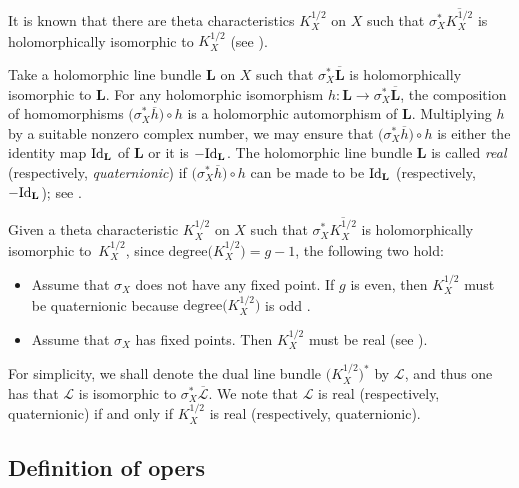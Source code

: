 \documentclass[pdftex]{sigma}
\numberwithin{equation}{section}
\begin{document}
It is known that there are theta characteristics $K^{1/2}_X$ on $X$ such that $\sigma^*_X
\overline{K^{1/2}_X}$ is holomorphically isomorphic to $K^{1/2}_X$ (see \cite[p.~61, Remark
2]{At2}).

Take a holomorphic line bundle $\mathbf L$ on $X$ such that $\sigma^*_X \overline{\mathbf
L}$ is holomorphically isomorphic to $\mathbf L$. For any holomorphic isomorphism $h\colon
{\mathbf L} \longrightarrow \sigma^*_X \overline{\mathbf L}$, the composition of
homomorphisms $\bigl(\sigma^*_X \overline{h}\bigr)\circ h$ is a holomorphic automorphism of ${\mathbf
L}$. Multiplying $h$ by a suitable nonzero complex number, we may ensure that $\bigl(\sigma^*_X
\overline{h}\bigr)\circ h$ is either the identity map ${\rm Id}_{\mathbf L}$ of $\mathbf L$ or
it is $-{\rm Id}_{\mathbf L}$. The holomorphic line bundle $\mathbf L$ is called {\it real}
(respectively, \textit{quaternionic}) if $\bigl(\sigma^*_X \overline{h}\bigr)\circ h$ can be made to
be ${\rm Id}_{\mathbf L}$ (respectively, $-{\rm Id}_{\mathbf L}$); see \cite[p.~206,
Definition 3.3]{BHH}.

Given a theta characteristic $K^{1/2}_X$ on $X$ such that $\sigma^*_X \overline{K^{1/2}_X}$
is holomorphically isomorphic to~$K^{1/2}_X$, since $\text{degree}\bigl(K^{1/2}_X\bigr) = g-1$, the following two hold:
\begin{itemize}\itemsep=0pt
\item[(1)] Assume that $\sigma_X$ does not have any fixed point. If $g$ is even, then $K^{1/2}_X$ must be quaternionic
because $\text{degree}\bigl(K^{1/2}_X\bigr)$ is odd \cite[p.~210, Proposition 4.2]{BHH}.

\item[(2)] Assume that $\sigma_X$ has fixed points. Then $K^{1/2}_X$ must be real (see \cite[p.~210, Section 4.2]{BHH}).
\end{itemize}

\begin{Definition}\label{dtc}
For simplicity, we shall denote the dual line bundle $\bigl(K^{1/2}_X\bigr)^*$ by $\mathcal L$, and thus one has that $\mathcal L$ is
isomorphic to $\sigma^*_X \overline{\mathcal L}$. We note that $\mathcal L$ is real
(respectively, quaternionic) if and only if $K^{1/2}_X$ is real (respectively,
quaternionic).
\end{Definition}

\subsection{Definition of opers}
\end{document}
